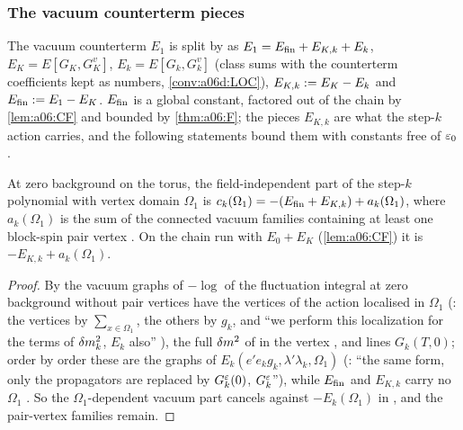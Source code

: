 
\subsubsection*{The vacuum counterterm pieces}

The vacuum counterterm $E_1$ is split by \cite[(1.26), (1.28), (1.30)]{Ba3} as $E_1=E_{\mathrm{fin}}+E_{K,k}+E_k$, $E_K=E[G_K,G^v_K]$, $E_k=E[G_k,G^v_k]$ (class sums \cite[(1.24)]{Ba3} with the counterterm coefficients kept as numbers, \cref{conv:a06d:LOC}), $E_{K,k}:= E_K-E_k$ and $E_{\mathrm{fin}}:= E_1-E_K$. $E_{\mathrm{fin}}$ is a global constant, factored out of the chain by \cref{lem:a06:CF} and bounded by \cref{thm:a06:F}; the pieces $E_{K,k}$ are what the step-$k$ action carries, and the following statements bound them with constants free of $\varepsilon_0$.

\begin{lemma}\label{lem:a06e:VK0}
At zero background on the torus, the field-independent part of the step-$k$ polynomial \cite[(1.4)--(1.5)]{Ba3} with vertex domain $\Omega_1$ is $c_k(\Omega_1)=-(E_{\mathrm{fin}}+E_{K,k})+a_k(\Omega_1)$, where $a_k(\Omega_1)$ is the sum of the connected vacuum families containing at least one block-spin pair vertex \cite[(1.12)--(1.14)]{Ba3}. On the chain run with $E_0+E_K$ (\cref{lem:a06:CF}) it is $-E_{K,k}+a_k(\Omega_1)$.
\end{lemma}

\begin{proof}
By \cite[(1.4)]{Ba3} the vacuum graphs of $-\log$ of the fluctuation integral at zero background without pair vertices have the vertices of the action localised in $\Omega_1$ (\cite[p.~419]{Ba3}: the vertices \cite[(1.6)--(1.7)]{Ba3} by $\sum_{x\in\Omega_1}$, the others by $g_k$, and ``we perform this localization for the terms of $\delta m^2_k$, $E_k$ also'' \cite[p.~420]{Ba3}), the full $\delta m^2$ of \cite[(1.29)]{Ba3} in the vertex \cite[(1.7)]{Ba3}, and lines $G_k(T,0)$; order by order these are the graphs of $E_k(e'e_kg_k,\lambda'\lambda_k,\Omega_1)$ (\cite[p.~418]{Ba3}: ``the same form, only the propagators are replaced by $G^{\varepsilon}_k(0)$, $G^{\varepsilon}_k$''), while $E_{\mathrm{fin}}$ and $E_{K,k}$ carry no $\Omega_1$ \cite[(1.30), p.~419]{Ba3}. So the $\Omega_1$-dependent vacuum part cancels against $-E_k(\Omega_1)$ in \cite[(1.5)]{Ba3}, and the pair-vertex families remain.
\end{proof}

